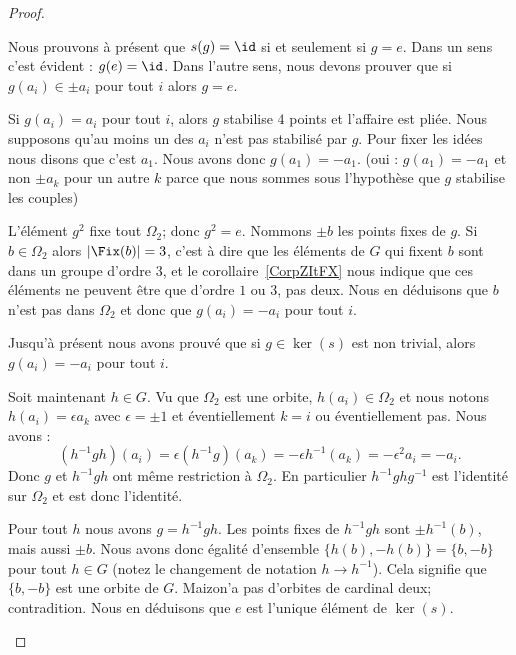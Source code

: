 \begin{proof}
\begin{subproof}
\begin{subproof}
                    Nous prouvons à présent que \( s(g)=\id\) si et seulement si \( g=e\). Dans un sens c'est évident : \( g(e)=\id\). Dans l'autre sens, nous devons prouver que si \( g(a_i)\in \pm a_i\) pour tout \( i\) alors \( g=e\).

                    Si \( g(a_i)=a_i\) pour tout \( i\), alors \( g\) stabilise \( 4\) points et l'affaire est pliée. Nous supposons qu'au moins un des \( a_i\) n'est pas stabilisé par \( g\). Pour fixer les idées nous disons que c'est \( a_1\). Nous avons donc \( g(a_1)=-a_1\). (oui : \( g(a_1)=-a_1\) et non \( \pm a_k\) pour un autre \( k\) parce que nous sommes sous l'hypothèse que \( g\) stabilise les couples)

                    L'élément \( g^2\) fixe tout \( \Omega_2\); donc \( g^2=e\). Nommons \( \pm b\) les points fixes de \( g\). Si \( b\in \Omega_2\) alors \( | \Fix(b) |=3\), c'est à dire que les éléments de \( G\) qui fixent \( b\) sont dans un groupe d'ordre \( 3\), et le corollaire~\ref{CorpZItFX} nous indique que ces éléments ne peuvent être que d'ordre \( 1\) ou \( 3\), pas deux. Nous en déduisons que \( b\) n'est pas dans \( \Omega_2\) et donc que \( g(a_i)=-a_i\) pour tout \( i\).

                    Jusqu'à présent nous avons prouvé que si \( g\in \ker(s)\) est non trivial,  alors \( g(a_i)=-a_i\) pour tout \( i\).

                    Soit maintenant \( h\in G\). Vu que \( \Omega_2\) est une orbite, \( h(a_i)\in \Omega_2\) et nous notons \( h(a_i)=\epsilon a_k\) avec \( \epsilon=\pm 1\) et éventiellement \( k=i\) ou éventiellement pas. Nous avons :
                    \begin{equation}
                        (h^{-1}gh)(a_i)=\epsilon (h^{-1} g)(a_k)=-\epsilon h^{-1}(a_k)=-\epsilon^2 a_i=-a_i.
                    \end{equation}
                    Donc \( g\) et \( h^{-1} g h\) ont même restriction à \( \Omega_2\). En particulier \( h^{-1} ghg^{-1}\) est l'identité sur \( \Omega_2\) et est donc l'identité.

                    Pour tout \( h\) nous avons \( g=h^{-1} gh\). Les points fixes de \( h^{-1}g h\) sont \( \pm h^{-1}(b)\), mais aussi \( \pm b\). Nous avons donc égalité d'ensemble \( \{ h(b),-h(b) \}=\{ b,-b \}\) pour tout \( h\in G\) (notez le changement de notation \( h\to h^{-1}\)). Cela signifie que \( \{ b,-b \}\) est une orbite de \( G\). Maizon'a pas d'orbites de cardinal deux; contradition. Nous en déduisons que \( e\) est l'unique élément de \( \ker(s)\).


\end{subproof}
\end{subproof}
\end{proof}

